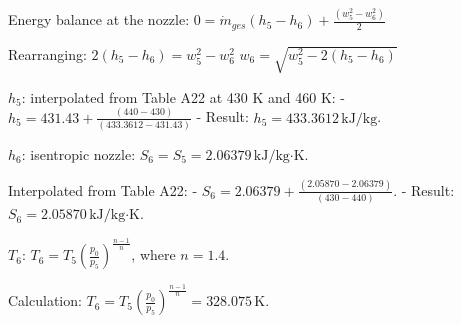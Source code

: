 Energy balance at the nozzle:  
\( 0 = \dot{m}_{ges} (h_5 - h_6) + \frac{(w_5^2 - w_6^2)}{2} \)  

Rearranging:  
\( 2 (h_5 - h_6) = w_5^2 - w_6^2 \)  
\( w_6 = \sqrt{w_5^2 - 2 (h_5 - h_6)} \)  

\( h_5 \): interpolated from Table A22 at 430 K and 460 K:  
- \( h_5 = 431.43 + \frac{(440 - 430)}{(433.3612 - 431.43)} \)  
- Result: \( h_5 = 433.3612 \, \text{kJ/kg} \).  

\( h_6 \): isentropic nozzle:  
\( S_6 = S_5 = 2.06379 \, \text{kJ/kg·K} \).  

Interpolated from Table A22:  
- \( S_6 = 2.06379 + \frac{(2.05870 - 2.06379)}{(430 - 440)} \).  
- Result: \( S_6 = 2.05870 \, \text{kJ/kg·K} \).  

\( T_6 \):  
\( T_6 = T_5 \left( \frac{p_0}{p_5} \right)^{\frac{n-1}{n}} \), where \( n = 1.4 \).  

Calculation:  
\( T_6 = T_5 \left( \frac{p_0}{p_5} \right)^{\frac{n-1}{n}} = 328.075 \, \text{K} \).